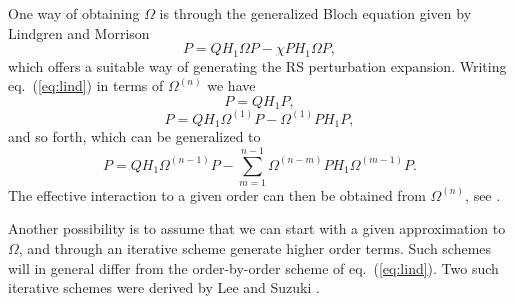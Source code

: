 One way of obtaining $\Omega$ is through the generalized Bloch
equation given by Lindgren and Morrison \cite{lm85}
\begin{equation}
[\Omega, H_0]P=QH_1\Omega P-\chi PH_1\Omega P,
\label{eq:lind}
\end{equation}
which offers a suitable way of generating the RS perturbation expansion.
Writing eq.\ (\ref{eq:lind}) in terms of $\Omega^{(n)}$ we have
\begin{equation}
[\Omega^{(1)}, H_0]P=QH_1P,
\end{equation}
\begin{equation}
[\Omega^{(2)}, H_0]P=QH_1\Omega^{(1)} P- \Omega^{(1)} PH_1P,
\end{equation}
and so forth,  which can be generalized to
\begin{equation}
[\Omega^{(n)}, H_0]P=QH_1\Omega^{(n-1)} P- \sum_{m=1}^{n-1}
\Omega^{(n-m)} PH_1\Omega^{(m-1)}P.
\end{equation}
The effective interaction to a given order can then be obtained from
$\Omega^{(n)}$, see \cite{lm85}.





Another possibility is to assume that we can start with a given
approximation to $\Omega$, and through an iterative scheme generate
higher order terms. Such schemes will in general differ from the
order-by-order scheme of eq.\ (\ref{eq:lind}).  Two such iterative
schemes were derived  by Lee and Suzuki \cite{ls80}. 


